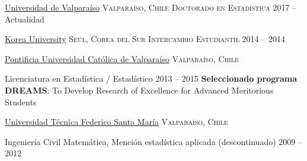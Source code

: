 \documentclass[10pt,a4paper]{article}
\begin{document}


\headedsection %
{\href{https://ideuv.uv.cl/index.php/es/?view=page&id=91}{Universidad de Valparaíso}}
{\textsc{Valparaíso, Chile}}
 {
\headedsubsection %
{\textsc{Doctorado en Estadística}}
{2017 -- Actualidad}
{}
}



\headedsection %
{\href{http://www.korea.ac.kr}{Korea University}}
{\textsc{Seúl, Corea del Sur}}
 {
\headedsubsection %
{\textsc{Intercambio Estudiantil}}
{2014 -- 2014}
{}
}


\headedsection %
{\href{http://www.pucv.cl}{Pontificia Universidad Cat\'olica de Valpara\'iso}}
{\textsc{Valpara\'iso, Chile}} {

\headedsubsection %
{Licenciatura en Estadística / Estadístico}
{2013 -- 2015}
{\textbf{Seleccionado programa DREAMS}: To
Develop Research of Excellence for Advanced Meritorious Students}
}




\headedsection
{\href{http://www.usm.cl}{Universidad T\'ecnica Federico Santa Mar\'ia}}
{\textsc{Valpara\'iso, Chile}} {

\headedsubsection 
{Ingeniería Civil Matemática, \textnormal{Mención estadística aplicada (descontinuado)}}
{2009 -- 2012} {}
}


\end{document}
